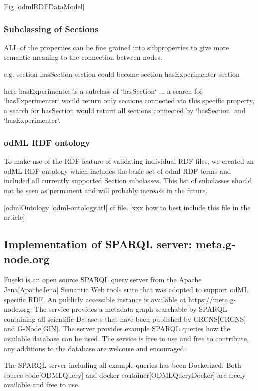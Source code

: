 \documentclass{article}
\begin{document}
Fig [odmlRDFDataModel]

\subsubsection{Subclassing of Sections}

ALL of the properties can be fine grained into subproperties to give more semantic
meaning to the connection between nodes.

e.g.
    section hasSection section
 could become
    section hasExperimenter section

 here hasExperimenter is a subclass of `hasSection` ... a search for `hasExperimenter`
 would return only sections connected via this specific property, a search for hasSection
 would return all sections connected by `hasSection` and `hasExperimenter`.

\subsubsection{odML RDF ontology}
To make use of the RDF feature of validating individual RDF files, we created an odML
RDF ontology which includes the basic set of odml RDF terms and included all currently
supported Section subclasses. This list of subclasses should not be seen as permanent and
will probably increase in the future.

[odmlOntology][odml-ontology.ttl] cf file. [xxx how to best include this file in the article]

\subsection{Implementation of SPARQL server: meta.g-node.org}

Fuseki is an open source SPARQL query server from the Apache Jena[ApacheJena]
Semantic Web tools suite that was adopted to support odML specific RDF.
An publicly accessible instance is available at https://meta.g-node.org.
The service provides a metadata graph searchable by SPARQL containing all scientific
Datasets that have been published by CRCNS[CRCNS] and G-Node[GIN].
The server provides example SPARQL queries how the available database can be used.
The service is free to use and free to contribute, any additions to the database
are welcome and encouraged.

The SPARQL server including all example queries has been Dockerized. Both source
code[ODMLQuery] and docker container[ODMLQueryDocker] are freely available and free to use.
\end{document}
